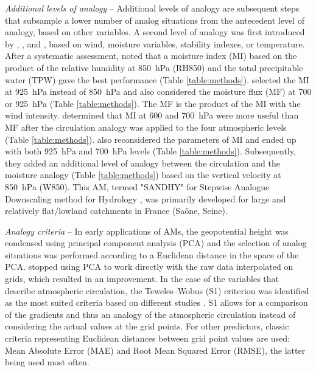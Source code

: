\documentclass[gmdd]{copernicus}
\begin{document}
\textit{Additional levels of analogy} -- Additional levels of analogy are subsequent steps that subsample a lower number of analog situations from the antecedent level of analogy, based on other variables. A second level of analogy was first introduced by \citet{Mandon1985}, \citet{Vallee1986}, and \citet{Gibergans-Baguena2007}, based on wind, moisture variables, stability indexes, or temperature. After a systematic assessment, \citet{Bontron2004} noted that a moisture index (MI) based on the product of the relative humidity at 850~hPa (RH850) and the total precipitable water (TPW) gave the best performance (Table \ref{table:methods}). \citet{Marty2010} selected the MI at 925~hPa instead of 850~hPa and also considered the moisture flux (MF) at 700 or 925~hPa (Table \ref{table:methods}). The MF is the product of the MI with the wind intensity. \citet{Horton2018a} determined that MI at 600 and 700~hPa were more useful than MF after the circulation analogy was applied to the four atmospheric levels (Table \ref{table:methods}). \citet{BenDaoud2016} also reconsidered the parameters of MI and ended up with both 925~hPa and 700~hPa levels (Table \ref{table:methods}). Subsequently, they added an additional level of analogy between the circulation and the moisture analogy (Table \ref{table:methods}) based on the vertical velocity at 850~hPa (W850). This AM, termed "SANDHY" for Stepwise Analogue Downscaling method for Hydrology \citep{BenDaoud2016, Caillouet2016}, was primarily developed for large and relatively flat/lowland catchments in France (Sa\^{o}ne, Seine).

\textit{Analogy criteria} -- In early applications of AMs, the geopotential height was condensed using principal component analysis (PCA) and the selection of analog situations was performed according to a Euclidean distance in the space of the PCA. \citet{Guilbaud1997} stopped using PCA to work directly with the raw data interpolated on grids, which resulted in an improvement. In the case of the variables that describe atmospheric circulation, the Teweles--Wobus (S1) criterion \citep[Eq. (\ref{eq:S1}), ][]{Teweles1954, Drosdowsky2003} was identified as the most suited criteria based on different studies \citep{Wilson1980, Woodcock1980, Guilbaud1998, Bontron2004}. S1 allows for a comparison of the gradients and thus an analogy of the atmospheric circulation instead of considering the actual values at the grid points. For other predictors, classic criteria representing Euclidean distances between grid point values are used: Mean Absolute Error (MAE) and Root Mean Squared Error (RMSE), the latter being used most often.
\end{document}
